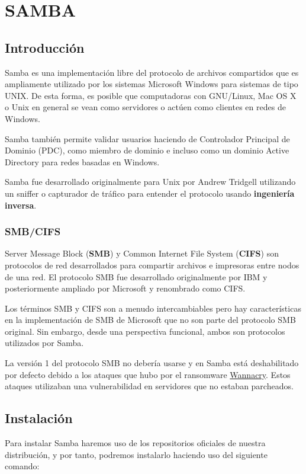 \documentclass{../../../yukibook.cls/yukibook}
\begin{document}
\chapter{SAMBA}
\section{Introducción}
Samba es una implementación libre del protocolo de archivos compartidos que es ampliamente utilizado por los sistemas Microsoft Windows para sistemas de tipo UNIX. De esta forma, es posible que computadoras con GNU/Linux, Mac OS X o Unix en general se vean como servidores o actúen como clientes en redes de Windows.

Samba también permite validar usuarios haciendo de Controlador Principal de Dominio (PDC), como miembro de dominio e incluso como un dominio Active Directory para redes basadas en Windows.

Samba fue desarrollado originalmente para Unix por Andrew Tridgell utilizando un sniffer o capturador de tráfico para entender el protocolo usando \textbf{ingeniería inversa}.

\subsection{SMB/CIFS}
Server Message Block (\textbf{SMB}) y Common Internet File System (\textbf{CIFS}) son protocolos de red desarrollados para compartir archivos e impresoras entre nodos de una red. El protocolo SMB fue desarrollado originalmente por IBM y posteriormente ampliado por Microsoft y renombrado como CIFS.

Los términos SMB y CIFS son a menudo intercambiables pero hay características en la implementación de SMB de Microsoft que no son parte del protocolo SMB original. Sin embargo, desde una perspectiva funcional, ambos son protocolos utilizados por Samba.

La versión 1 del protocolo SMB no debería usarse y en Samba está deshabilitado por defecto debido a los ataques que hubo por el ransomware \href{https://es.wikipedia.org/wiki/Ataques_ransomware_WannaCry}{Wannacry}. Estos ataques utilizaban una vulnerabilidad en servidores que no estaban parcheados.

\section{Instalación}
Para instalar Samba haremos uso de los repositorios oficiales de nuestra distribución, y por tanto, podremos instalarlo haciendo uso del siguiente comando:
\end{document}
